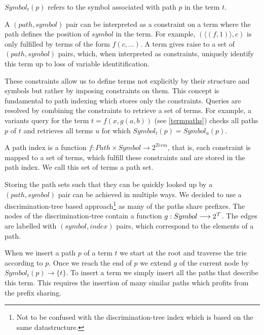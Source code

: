 \begin{figure}
\end{figure}

\begin{defn}
  $Symbol_{t}(p)$ refers to the symbol associated with path $p$ in the term $t$.
\end{defn}

A $(path, symbol)$ pair can be interpreted as a constraint on a term where the path defines the position of $symbol$ in the term. For example, $(\langle (f,1) \rangle, c)$ is only fulfilled by terms of the form $f(c,...)$. A term gives raise to a set of $(path, symbol)$ pairs, which, when interpreted as constraints, uniquely identify this term up to loss of variable identitification.

These constraints allow us to define terms not explicitly by their structure and symbols but rather by imposing constraints on them. This concept is fundamental to path indexing which stores only the constraints. Queries are resolved by combining the constraints to retrieve a set of terms. For example, a variants query for the term $t = f(x,g(a,b))$ (see \cref{termpaths}) checks all paths $p$ of $t$ and retrieves all terms $u$ for which $Symbol_{t}(p) = Symbol_{u}(p)$.

\begin{defn}
  A path index is a function $f: Path \times Symbol \longrightarrow 2^{Term}$, that is, each constraint is mapped to a set of terms, which fulfill these constraints and are stored in the path index. We call this set of terms a path set.
\end{defn}

Storing the path sets such that they can be quickly looked up by a $(path, symbol)$ pair can be achieved in multiple ways. We decided to use a discrimination-tree based approach\footnote{Not to be confused with the discrimination-tree index which is based on the same datastructure.} as many of the paths share prefixes. The nodes of the discrimination-tree contain a function $g: Symbol  \longrightarrow 2^{\mathcal{T}}$. The edges are labelled with $(symbol, index)$ pairs, which correspond to the elements of a path.

When we insert a path $p$ of a term $t$ we start at the root and traverse the trie according to $p$. Once we reach the end of $p$ we extend $g$ of the current node by $Symbol_{t}(p) \longrightarrow \{t\}$. To insert a term we simply insert all the paths that describe this term. This requires the insertion of many similar paths which profits from the prefix sharing.

